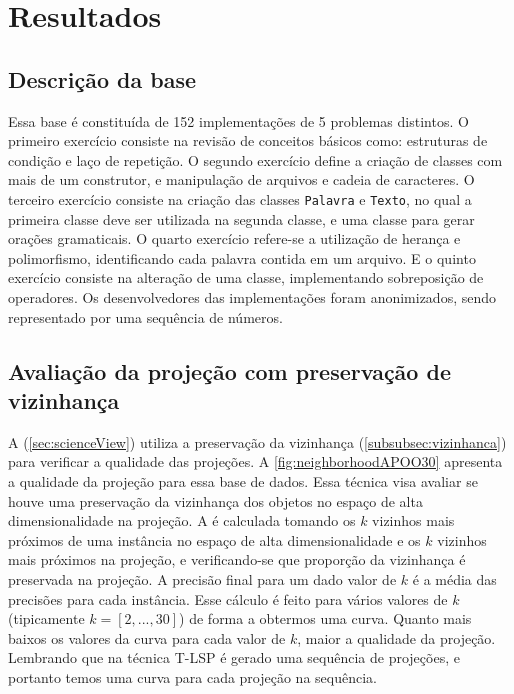 \chapter{Resultados}
\label{chap:resultados}

	
	
	\section{Descrição da base}
	\label{sec:resultados:base-apoo}

		Essa base é constituída de 152 implementações de 5 problemas distintos. O primeiro exercício
		consiste na revisão de conceitos básicos como: estruturas de condição e laço de repetição. O
		segundo exercício define a criação de classes com mais de um construtor, e manipulação de
		arquivos e cadeia de caracteres. O terceiro exercício consiste na criação das classes
		\texttt{Palavra} e \texttt{Texto}, no qual a primeira classe deve ser utilizada na segunda
		classe, e uma classe para gerar orações gramaticais. O quarto exercício refere-se a
		utilização de herança e polimorfismo, identificando cada palavra contida em um arquivo. E
		o quinto exercício consiste na alteração de uma classe, implementando sobreposição de
		operadores. Os desenvolvedores das implementações foram anonimizados, sendo representado
		por uma sequência de números.
		
	
	\section{Avaliação da projeção com preservação de vizinhança}

	A  (\cref{sec:scienceView}) utiliza a preservação da vizinhança
	(\cref{subsubsec:vizinhanca}) para verificar a qualidade das projeções. A \cref{fig:neighborhoodAPOO30}
	apresenta a qualidade da projeção para essa base de dados. Essa técnica visa avaliar
	se houve uma preservação da vizinhança dos objetos no espaço de alta dimensionalidade
	na projeção. A  é calculada tomando os $k$ vizinhos
	mais próximos de uma instância no espaço de alta dimensionalidade e os $k$ vizinhos
	mais próximos na projeção, e verificando-se que proporção da vizinhança é preservada
	na projeção. A precisão final para um dado valor de $k$ é a média das precisões para
	cada instância. Esse cálculo é feito para vários valores de $k$ (tipicamente $k=[2,...,30]$)
	de forma a obtermos uma curva. Quanto mais baixos os valores da curva para cada valor
	de $k$, maior a qualidade da projeção. Lembrando que na técnica \acl{T-LSP} \cite{Alencar}
	é gerado uma sequência de projeções, e portanto temos uma curva para cada projeção na
	sequência.
	
